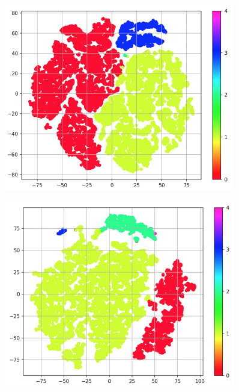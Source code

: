 \documentclass[a0,portrait]{a0poster}
\begin{document}
\begin{multicols}{2}
\begin{center}
\begin{minipage}[c]{0.18\linewidth}
		\label{fig: latent_variables_b}
	\end{minipage}
	\begin{minipage}[c]{0.18\linewidth}
		\centering
		\includegraphics[width=\linewidth]{latent_variables/c}
		\label{fig: latent_variables_c}
	\end{minipage}
	\begin{minipage}[c]{0.18\linewidth}
		\centering
		\includegraphics[width=\linewidth]{latent_variables/d}
		\label{fig: latent_variables_d}
	\end{minipage}
\end{center}\vspace{1cm}


\end{multicols}
\end{document}
